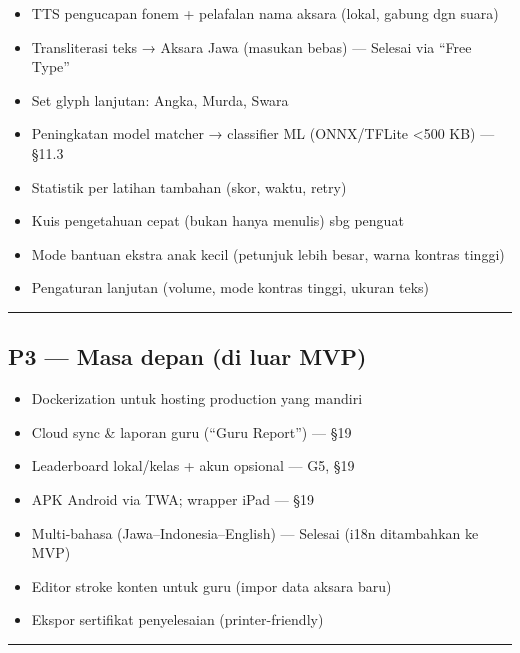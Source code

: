 \documentclass[
  11pt,
]{article}
\providecommand{\tightlist}{%
  \setlength{\itemsep}{0pt}\setlength{\parskip}{0pt}}
\begin{document}
\begin{itemize}
\tightlist
\item[$\square$]
  TTS pengucapan fonem + pelafalan nama aksara (lokal, gabung dgn suara)
\item[$\boxtimes$]
  Transliterasi teks → Aksara Jawa (masukan bebas) --- Selesai via
  ``Free Type''
\item[$\square$]
  Set glyph lanjutan: Angka, Murda, Swara
\item[$\square$]
  Peningkatan model matcher → classifier ML (ONNX/TFLite \textless500
  KB) --- §11.3
\item[$\square$]
  Statistik per latihan tambahan (skor, waktu, retry)
\item[$\square$]
  Kuis pengetahuan cepat (bukan hanya menulis) sbg penguat
\item[$\square$]
  Mode bantuan ekstra anak kecil (petunjuk lebih besar, warna kontras
  tinggi)
\item[$\square$]
  Pengaturan lanjutan (volume, mode kontras tinggi, ukuran teks)
\end{itemize}

\begin{center}\rule{0.5\linewidth}{0.5pt}\end{center}

\subsection{P3 --- Masa depan (di luar
MVP)}\label{p3-masa-depan-di-luar-mvp}

\begin{itemize}
\tightlist
\item[$\boxtimes$]
  Dockerization untuk hosting production yang mandiri
\item[$\square$]
  Cloud sync \& laporan guru (``Guru Report'') --- §19
\item[$\square$]
  Leaderboard lokal/kelas + akun opsional --- G5, §19
\item[$\square$]
  APK Android via TWA; wrapper iPad --- §19
\item[$\boxtimes$]
  Multi-bahasa (Jawa--Indonesia--English) --- Selesai (i18n ditambahkan
  ke MVP)
\item[$\square$]
  Editor stroke konten untuk guru (impor data aksara baru)
\item[$\square$]
  Ekspor sertifikat penyelesaian (printer-friendly)
\end{itemize}

\begin{center}\rule{0.5\linewidth}{0.5pt}\end{center}
\end{document}
